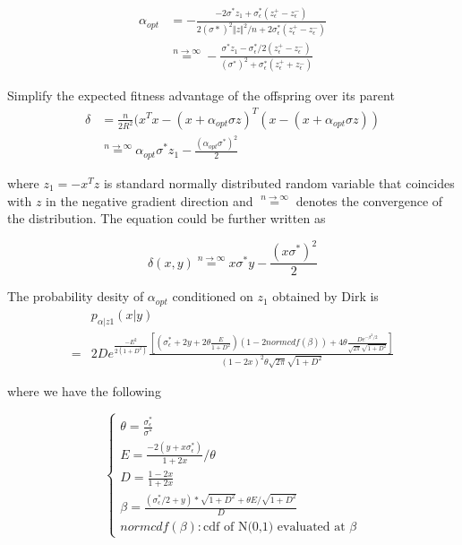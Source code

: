 \begin{align*} 
 \alpha_{opt} 
 &= -\frac{ -2\sigma^* z_1 + \sigma_\epsilon^*(z_\epsilon^+ - z_\epsilon^-) }{2 (\sigma*)^2 \Vert z \Vert^2 /n   +  2\sigma_\epsilon^* (z_\epsilon^+ - z_\epsilon^-)  } \\
 & \overset{n \rightarrow \infty }{=}      -\frac{ \sigma^* z_1  -  \sigma_\epsilon^*/2(z_\epsilon^+  - z_\epsilon^-) }{ (\sigma^*)^2 + \sigma_\epsilon^* (z_\epsilon^+ +z_\epsilon^-) }  
 \end{align*}

Simplify the expected fitness advantage of the offspring over its parent
\begin{align*} 
\delta 
& = \frac{n}{2R^2} (x^Tx - (x+\alpha_{opt} \sigma z)^T (x - (x+\alpha_{opt} \sigma z) ) \\
& \overset{n \rightarrow \infty }{=}  \alpha_{opt}  \sigma^* z_1 - \frac{ ( \alpha_{opt}\sigma^*)^2 }{2} 
 \end{align*}


where $z_1 = -x^T z$ is standard normally distributed random variable that coincides with $z$ in the negative gradient direction and $\overset{n \rightarrow \infty }{=}$ denotes the convergence of the distribution. The equation could be further written as 

$$\delta(x,y)  \overset{n \rightarrow \infty }{=} x\sigma^* y - \frac{(x\sigma^*)^2}{2}  $$


The probability desity of $\alpha_{opt}$ conditioned on $z_1$ obtained by Dirk is 
\begin{align*} 
 & p_{\alpha|z1}(x|y) \\ = & 2De^{\frac{-E^2}{2(1+D^2)} }  \frac{ \left [ ( \sigma_\epsilon^* +2y+2\theta \frac{E}{1+D^2})(1-2normcdf(\beta)) +4\theta \frac{De^{-\beta^2/2  }}{ \sqrt{2 \pi}  \sqrt{1+D^2}}   \right ]    }{                         (1-2x)^2 \theta  \sqrt{2 \pi}   \sqrt{1+D^2}   } 
 \end{align*} 

where we have the following 

$$\begin{cases} 
\theta = \frac{\sigma_\epsilon^*}{\sigma^*}  \\
E =  \frac{-2(y+x \sigma_\epsilon^*  )}{1+2x} /\theta  \\
D = \frac{1-2x}{1+2x}  \\
\beta = \frac{  (  \sigma_\epsilon^*  /2+y)*\sqrt{1+D^2}+\theta E/\sqrt{1+D^2} }{D} \\
normcdf(\beta): \text{cdf\ of\ N(0,1) evaluated\ at\ } \beta
\end{cases}   $$


